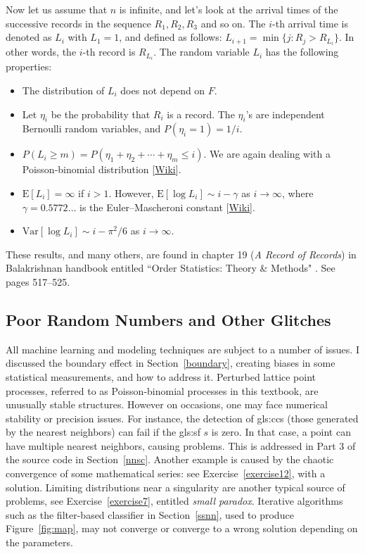 \documentclass[10pt]{article}
\begin{document}
\noindent Now let us assume that $n$ is infinite, and let's look at the arrival times of the successive records in the sequence $R_1,R_2,R_3$ and so on. The $i$-th arrival time is denoted as $L_i$
with $L_1=1$, 
and defined   as follows: $L_{i+1}=\min\{j : R_j > R_{L_i}\}$. In other words, the $i$-th record is $R_{L_i}$. The random variable $L_i$ has the following properties:
\begin{itemize}
\item The distribution of $L_i$ does not depend on $F$.
\item Let $\eta_i$ be the probability that $R_i$ is a record. The $\eta_i$'s are independent Bernoulli random variables, and  $P(\eta_i=1)=1/i$.
\item $P(L_i\geq m) = P(\eta_1+\eta_2+\cdots+\eta_m\leq i)$. We are again dealing with a \textcolor{index}{Poisson-binomial distribution}
 [\href{https://en.wikipedia.org/wiki/Poisson_binomial_distribution}{Wiki}].
\item $\mbox{E}[L_i]=\infty$ if $i>1$. However, $\mbox{E}[\log L_i]\sim i-\gamma$ as $i\rightarrow \infty$, where $\gamma=0.5772\dots$ is
the Euler–Mascheroni constant [\href{https://bit.ly/35eVQQl}{Wiki}].
\item $\mbox{Var}[\log L_i]\sim i - \pi^2/6$ as $i\rightarrow\infty$.
\end{itemize}
These results, and many others, are found in chapter 19 ({\em A Record of Records}) in Balakrishnan handbook entitled ``Order Statistics: Theory \& Methods" \cite{order2}. 
See pages 517--525.



\subsection{Poor Random Numbers and Other Glitches}\label{flaws}


All machine learning and modeling techniques are subject to a number of issues. I discussed the boundary effect in Section~\ref{boundary}, creating biases in some statistical
measurements, and how to address it. Perturbed lattice point processes, referred to as Poisson-binomial processes in this textbook, are unusually stable structures. However on occasions, one may face \textcolor{index}{numerical stability} or precision issues. For instance, the detection of 
\glspl{gls:cc} (those generated by the \textcolor{index}{nearest neighbors}) can fail if the 
\gls{gls:sf} $s$ is zero. In that case, a point can have multiple nearest neighbors, causing problems. This is addressed in Part 3 of the source code in Section~\ref{nnsc}. Another example is  caused by the chaotic convergence of some mathematical series: see Exercise~\ref{exercise12}, with a solution. Limiting distributions near a singularity are another typical source of problems, see Exercise~\ref{exercise7}, entitled {\em small
 paradox}. Iterative algorithms such as the filter-based classifier in Section~\ref{ssnn}, used to produce
Figure~\ref{fig:map}, may not converge or converge to a wrong solution depending on the parameters. 
\end{document}
